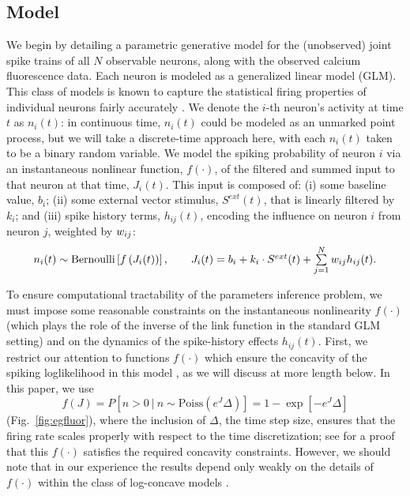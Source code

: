 \long{}

\subsection{Model}
\label{sec:methods:markov-setup}

We begin by detailing a parametric generative model for the (unobserved) joint spike trains of all $N$ observable neurons, along with the observed calcium fluorescence data. Each neuron is modeled as a generalized linear model (GLM). This class of models is known to capture the statistical firing properties of individual neurons fairly accurately \cite{BRIL88,CSK88,BRIL92,PG00,PILL07,PAN03d,PAN04c,Rigat06,TRUC05,NYK06,KP06,Vidne08,Stevenson2009}. We denote the $i$-th neuron's activity at time $t$ as $n_i(t)$: in continuous time, $n_i(t)$ could be modeled as an unmarked point process, but we will take a discrete-time approach here, with each $n_i(t)$ taken to be a binary random variable. We model the spiking probability of neuron $i$ via an instantaneous nonlinear function, $f(\cdot)$, of the filtered and summed input to that neuron at that time, $J_i(t)$. This input is composed of: (i) some baseline value, $b_i$; (ii) some external vector stimulus, $S^{ext}(t)$, that is linearly filtered by $k_i$; and (iii) spike history terms, $h_{ij}(t)$, encoding the influence on neuron $i$ from neuron $j$, weighted by $w_{ij}$:
\begin{equation} \label{eqn:glm:definition}
\begin{array}{l}
n_i(t) \sim \text{Bernoulli}\left[f\left(J_i(t) \right) \right], \qquad
J_i(t)=b_i+k_i\cdot S^{ext}(t)+\sum \limits_{j=1}^{N} \w_{ij} h_{ij}(t).
\end{array}
\end{equation}

To ensure computational tractability of the parameters inference problem, we must impose some reasonable constraints on the instantaneous nonlinearity $f(\cdot)$ (which plays the role of the inverse of the link function in the standard GLM setting) and on the dynamics of the spike-history effects $h_{ij}(t)$. First, we restrict our attention to functions $f(\cdot)$ which ensure the concavity of the spiking loglikelihood in this model \cite{PAN04c,Escola07}, as we will discuss at more length below. In this paper, we use
\begin{equation}
f(J) = P\left[n>0 ~|~ n \sim \text{Poiss}\left(e^J\Delta\right)\right] = 1 - \exp[-e^J \Delta]
\end{equation}
(Fig.~\ref{fig:egfluor}), where the inclusion of $\Delta$, the time step size, ensures that the firing rate scales properly with respect to the time discretization; see \cite{Escola07} for a proof that this $f(\cdot)$ satisfies the required concavity constraints. However, we should note that in our experience the results depend only weakly on the details of $f(\cdot)$ within the class of log-concave models \cite{LD89,PAN04c}.

